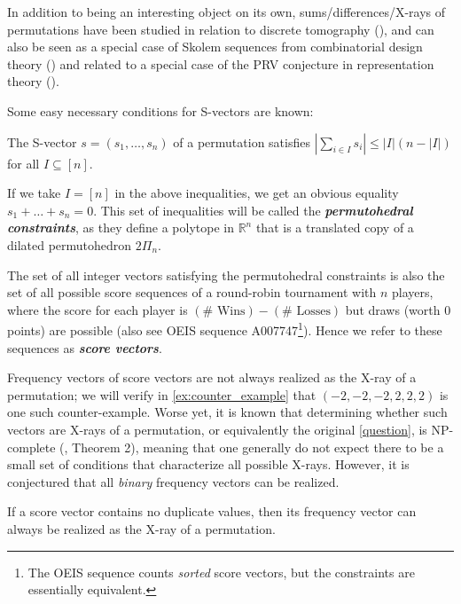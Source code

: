 \documentclass[letterpaper,reqno,11pt]{amsart}
\newcommand{\bfemph}[1]{\textbf{\emph{#1}}}
\begin{document}
In addition to being an interesting object on its own, sums/differences/X-rays of permutations have been studied in relation to discrete tomography (\cite{HK1999}), and can also be seen as a special case of Skolem sequences from combinatorial design theory (\cite{CD2006}) and related to a special case of the PRV conjecture in representation theory (\cite{PRV1967}). 

Some easy necessary conditions for S-vectors are known:

\begin{proposition}
    The S-vector $s = (s_1, \dots, s_n)$ of a permutation satisfies $\left|\sum_{i\in I} s_i\right| \leq |I|(n-|I|)$ for all $I\subseteq [n]$.
\end{proposition}

\begin{remark}
    If we take $I = [n]$ in the above inequalities, we get an obvious equality $s_1 + \dots + s_n = 0$. This set of inequalities will be called the \bfemph{permutohedral constraints}, as they define a polytope in $\mathbb{R}^n$ that is a translated copy of a dilated permutohedron $2\Pi_n$. 
    
    The set of all integer vectors satisfying the permutohedral constraints is also the set of all possible score sequences of a round-robin tournament with $n$ players, where the score for each player is $(\#\text{ Wins}) - (\#\text{ Losses})$ but draws (worth 0 points) are possible (also see OEIS sequence A007747\footnote{The OEIS sequence counts \emph{sorted} score vectors, but the constraints are essentially equivalent.}). Hence we refer to these sequences as \bfemph{score vectors}.
\end{remark}

Frequency vectors of score vectors are not always realized as the X-ray of a permutation; we will verify in \cref{ex:counter_example} that $(-2, -2, -2, 2, 2, 2)$ is one such counter-example. Worse yet, it is known that determining whether such vectors are X-rays of a permutation, or equivalently the original \cref{question}, is NP-complete (\cite{BDGV2008}, Theorem 2), meaning that one generally do not expect there to be a small set of conditions that characterize all possible X-rays.
However, it is conjectured that all \emph{binary} frequency vectors can be realized.

\begin{conjecture}\label{conj:binary}
    If a score vector contains no duplicate values, then its frequency vector can always be realized as the X-ray of a permutation.
\end{conjecture}
\end{document}

